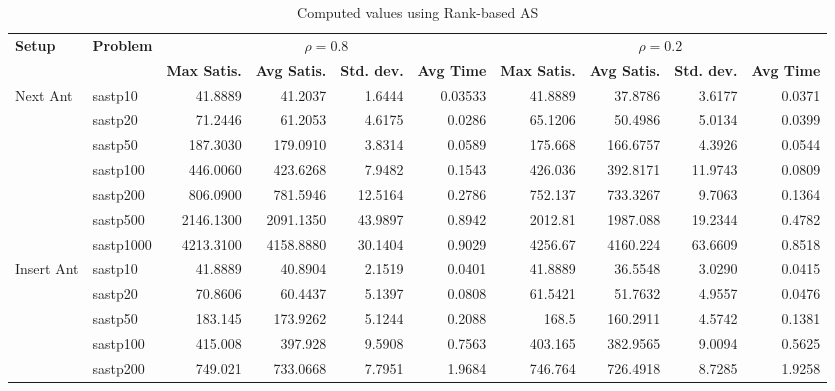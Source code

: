 \documentclass{article}
\begin{document}
\begin{table}[b!]
  \caption{Computed values using Rank-based AS}
  \vspace{1mm}
  \label{tab:conf1}
  \setlength{\tabcolsep}{1.4mm}
  \centering
  \resizebox{\textwidth}{!} {
  \begin{tabular}{p{1.6cm}|l||rrrr|rrrr}
    \multirow{2}{*}{\bfseries Setup} &
    \multirow{2}{*}{\bfseries Problem} &
      \multicolumn{4}{c}{$\rho=0.8$} &
      \multicolumn{4}{|c}{$\rho=0.2$} \\ 
    & &
    \bfseries Max Satis. &
    \bfseries Avg Satis. &
    \bfseries Std. dev. &
    \bfseries Avg Time &
    \bfseries Max Satis. &
    \bfseries Avg Satis. &
    \bfseries Std. dev. &
    \bfseries Avg Time 
    \\\hline
\multirow{7}{*}{Next Ant} 
  & sastp10 & 41.8889 & 41.2037 & 1.6444 & 0.03533 &
              41.8889 & 37.8786 & 3.6177 & 0.0371 \\ 
  & sastp20 & 71.2446 & 61.2053 & 4.6175 & 0.0286 &
              65.1206 & 50.4986 & 5.0134 & 0.0399 \\ 
  & sastp50 & 187.3030 & 179.0910 & 3.8314 & 0.0589 &
              175.668 & 166.6757 & 4.3926 & 0.0544 \\ 
  & sastp100 & 446.0060 & 423.6268 & 7.9482 & 0.1543 & 
               426.036 & 392.8171 & 11.9743 & 0.0809 \\ 
  & sastp200 & 806.0900 & 781.5946 & 12.5164 & 0.2786 & 
               752.137 & 733.3267 & 9.7063 & 0.1364 \\ 
  & sastp500 & 2146.1300 & 2091.1350 & 43.9897 & 0.8942 &
               2012.81 & 1987.088 & 19.2344 & 0.4782 \\ 
  & sastp1000 & 4213.3100 & 4158.8880 & 30.1404 & 0.9029 &
                4256.67 & 4160.224 & 63.6609 & 0.8518 \\
    \hline
\multirow{7}{*}{Insert Ant} 
  & sastp10 & 41.8889 & 40.8904 & 2.1519 & 0.0401 & 
              41.8889 & 36.5548 & 3.0290 & 0.0415 \\
  & sastp20 & 70.8606 & 60.4437 & 5.1397 & 0.0808 & 
              61.5421 & 51.7632 & 4.9557 & 0.0476 \\
  & sastp50 & 183.145 & 173.9262 & 5.1244 & 0.2088 & 
              168.5 & 160.2911 & 4.5742 & 0.1381 \\
  & sastp100 & 415.008 & 397.928 & 9.5908 & 0.7563 & 
               403.165 & 382.9565 & 9.0094 & 0.5625 \\
  & sastp200 & 749.021 & 733.0668 & 7.7951 & 1.9684 & 
               746.764 & 726.4918 & 8.7285 & 1.9258 \\

\end{tabular}}
\end{table}
\end{document}
